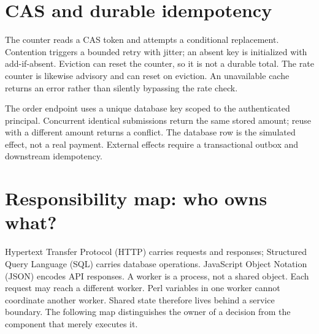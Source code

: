 \section{CAS and durable idempotency}
The counter reads a CAS token and attempts a conditional replacement. Contention triggers a bounded retry with jitter; an absent key is initialized with add-if-absent. Eviction can reset the counter, so it is not a durable total. The rate counter is likewise advisory and can reset on eviction. An unavailable cache returns an error rather than silently bypassing the rate check.

The order endpoint uses a unique database key scoped to the authenticated principal. Concurrent identical submissions return the same stored amount; reuse with a different amount returns a conflict. The database row is the simulated effect, not a real payment. External effects require a transactional outbox and downstream idempotency.


\section{Responsibility map: who owns what?}
Hypertext Transfer Protocol (HTTP) carries requests and responses; Structured Query Language (SQL) carries database operations. JavaScript Object Notation (JSON) encodes API responses. A worker is a process, not a shared object. Each request may reach a different worker. Perl variables in one worker cannot coordinate another worker. Shared state therefore lives behind a service boundary. The following map distinguishes the owner of a decision from the component that merely executes it.

